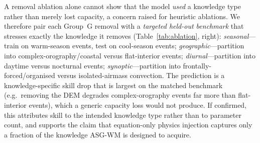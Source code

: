 \documentclass[fleqn,10pt]{wlscirep}
\begin{document}
A removal ablation alone cannot show that the model \emph{used} a knowledge type rather than merely lost capacity, a concern raised for heuristic ablations.
We therefore pair each Group~G removal with a \emph{targeted held-out benchmark} that stresses exactly the knowledge it removes (Table~\ref{tab:ablation}, right):
\emph{seasonal}---train on warm-season events, test on cool-season events;
\emph{geographic}---partition into complex-orography/coastal versus flat-interior events;
\emph{diurnal}---partition into daytime versus nocturnal events;
\emph{synoptic}---partition into frontally-forced/organised versus isolated-airmass convection.
The prediction is a knowledge-specific skill drop that is largest on the matched benchmark (e.g.\ removing the DEM degrades complex-orography events far more than flat-interior events), which a generic capacity loss would not produce.
If confirmed, this attributes skill to the intended knowledge type rather than to parameter count, and supports the claim that equation-only physics injection captures only a fraction of the knowledge ASG-WM is designed to acquire.
\end{document}
